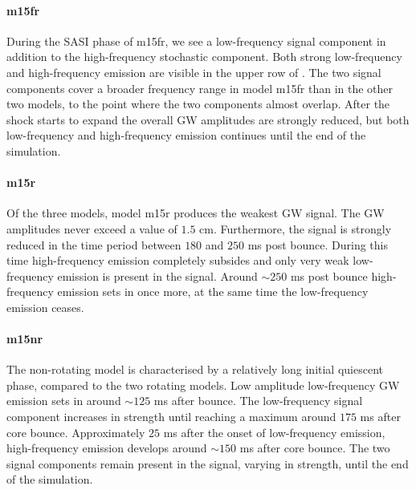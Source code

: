 \paragraph{m15fr}
During the SASI phase of m15fr, we see a low-frequency signal component in addition to the high-frequency stochastic component. Both strong low-frequency and high-frequency
emission are visible in the upper row of . The two signal components
cover a broader frequency range in model m15fr than in the other two models, to the point where the two components almost
overlap. After the shock starts to expand the overall GW amplitudes are strongly reduced, but
both low-frequency and high-frequency emission continues until the end of the simulation.

\paragraph{m15r}
Of the three models, model m15r produces the weakest GW signal. The GW amplitudes
never exceed a value of $1.5$ cm. Furthermore, the signal is strongly reduced in the
time period between $180$ and $250$ ms post bounce. During this time high-frequency emission
completely subsides and only very weak low-frequency emission is present in the signal.
Around $\sim 250$ ms post bounce high-frequency emission sets in once more, 
at the same time the low-frequency emission ceases. 

\paragraph{m15nr}
The non-rotating model is characterised by a relatively long initial quiescent phase, compared to the two
rotating models. Low amplitude low-frequency GW emission sets in around $\sim 125$ ms after bounce. The low-frequency
signal component increases in strength until reaching a maximum around $175$ ms after core bounce.
Approximately $25$ ms after the onset of low-frequency emission, high-frequency emission develops around
$\sim 150$ ms after core bounce. The two signal components remain present in the signal, varying in
strength, until the end of the simulation.

